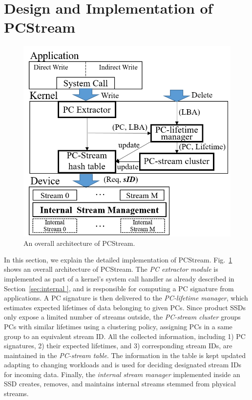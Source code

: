 \section{Design and Implementation of \textsf{PCStream}}

\begin{figure}[t]
	\centering
	\includegraphics[width=0.8\linewidth]{figure/overview}
	\caption{
		An overall architecture of \textsf{\small PCStream}. 
	}
	\label{fig:architecture}
\end{figure}


In this section, we explain the detailed implementation of \textsf{\small
PCStream}.  Fig.~\ref{fig:architecture} shows an overall architecture of
\textsf{\small PCStream}. The \textit{PC extractor module} is implemented as
part of a kernel's system call handler as already described in
Section~\ref{sec:internal }, and is responsible for computing a PC signature
from applications.  A PC signature is then delivered to the \textit{PC-lifetime
manager}, which estimates expected lifetimes of data belonging to given PCs.
Since product SSDs only expose a limited number of streams outside, the
\textit{PC-stream cluster} groups PCs with similar lifetimes using a clustering
policy, assigning PCs in a same group to an equivalent stream ID.  All the
collected information, including 1) PC signatures, 2) their expected lifetimes, and 3)
corresponding stream IDs, are maintained in the \textit{PC-stream table}.  The
information in the table is kept updated adapting to changing workloads and is
used for deciding designated stream IDs for incoming data. Finally, the
\textit{internal stream manager} implemented inside an SSD creates, removes,
and maintains internal streams stemmed from physical streams.

